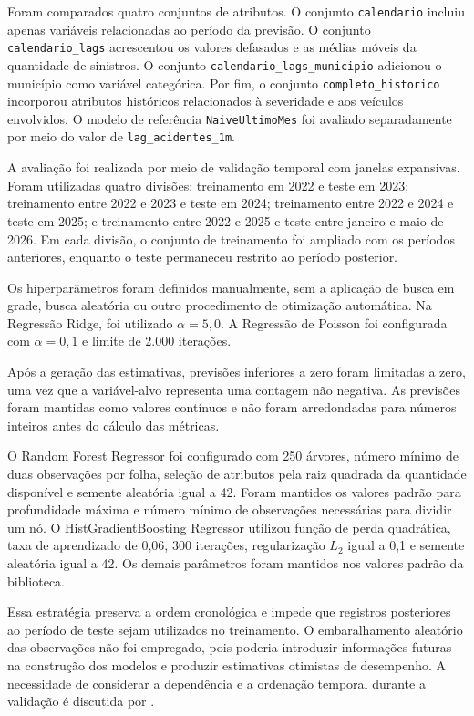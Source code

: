\documentclass[12pt]{article}
\begin{document}
Foram comparados quatro conjuntos de atributos. O conjunto \texttt{calendario} incluiu apenas variáveis relacionadas ao período da previsão. O conjunto \texttt{calendario\_lags} acrescentou os valores defasados e as médias móveis da quantidade de sinistros. O conjunto \texttt{calendario\_lags\_municipio} adicionou o município como variável categórica. Por fim, o conjunto \texttt{completo\_historico} incorporou atributos históricos relacionados à severidade e aos veículos envolvidos. O modelo de referência \texttt{NaiveUltimoMes} foi avaliado separadamente por meio do valor de \texttt{lag\_acidentes\_1m}.

A avaliação foi realizada por meio de validação temporal com janelas expansivas. Foram utilizadas quatro divisões: treinamento em 2022 e teste em 2023; treinamento entre 2022 e 2023 e teste em 2024; treinamento entre 2022 e 2024 e teste em 2025; e treinamento entre 2022 e 2025 e teste entre janeiro e maio de 2026. Em cada divisão, o conjunto de treinamento foi ampliado com os períodos anteriores, enquanto o teste permaneceu restrito ao período posterior.

Os hiperparâmetros foram definidos manualmente, sem a aplicação de busca em grade, busca aleatória ou outro procedimento de otimização automática. Na Regressão Ridge, foi utilizado $\alpha=5{,}0$. A Regressão de Poisson foi configurada com $\alpha=0{,}1$ e limite de 2.000 iterações.

Após a geração das estimativas, previsões inferiores a zero foram limitadas a zero, uma vez que a variável-alvo representa uma contagem não negativa. As previsões foram mantidas como valores contínuos e não foram arredondadas para números inteiros antes do cálculo das métricas.

O Random Forest Regressor foi configurado com 250 árvores, número mínimo de duas observações por folha, seleção de atributos pela raiz quadrada da quantidade disponível e semente aleatória igual a 42. Foram mantidos os valores padrão para profundidade máxima e número mínimo de observações necessárias para dividir um nó. O HistGradientBoosting Regressor utilizou função de perda quadrática, taxa de aprendizado de 0,06, 300 iterações, regularização $L_2$ igual a 0,1 e semente aleatória igual a 42. Os demais parâmetros foram mantidos nos valores padrão da biblioteca.

Essa estratégia preserva a ordem cronológica e impede que registros posteriores ao período de teste sejam utilizados no treinamento. O embaralhamento aleatório das observações não foi empregado, pois poderia introduzir informações futuras na construção dos modelos e produzir estimativas otimistas de desempenho. A necessidade de considerar a dependência e a ordenação temporal durante a validação é discutida por \cite{bergmeir2018crossvalidation}.
\end{document}
